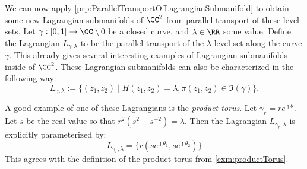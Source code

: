     We can now apply \cref{prp:ParallelTransportOfLagrangianSubmanifold} to obtain some new Lagrangian submanifolds of $\CC^2$ from parallel transport of these level sets. 
    Let $\gamma:[0, 1]\to \CC\setminus 0$ be a closed curve, and $\lambda\in \RR$ some value. 
    Define the Lagrangian $L_{\gamma, \lambda}$ to be the parallel transport of the $\lambda$-level set along the curve $\gamma$. 
    This already gives several interesting examples of Lagrangian submanifolds inside of $\CC^2$. 
    These Lagrangian submanifolds can also be characterized in the following way:
    \[L_{\gamma, \lambda}:=\{(z_1, z_2)\;|\; H(z_1, z_2)=\lambda, \pi(z_1, z_2)\in \Im(\gamma)\}.\]

    A good example of one of these Lagrangians is the \emph{product torus}. Let $\gamma_r=re^{\jmath\theta}$.
    Let $s$ be the real value so that $r^2(s^2-s^{-2})=\lambda$.  Then the Lagrangian $L_{\gamma_r, \lambda}$ is explicitly parameterized by:
    \[L_{\gamma_r, \lambda}=\{r(se^{\jmath\theta_1}, se^{\jmath\theta_2})\}\]
    This agrees with the definition of the product torus from \cref{exm:productTorus}.


